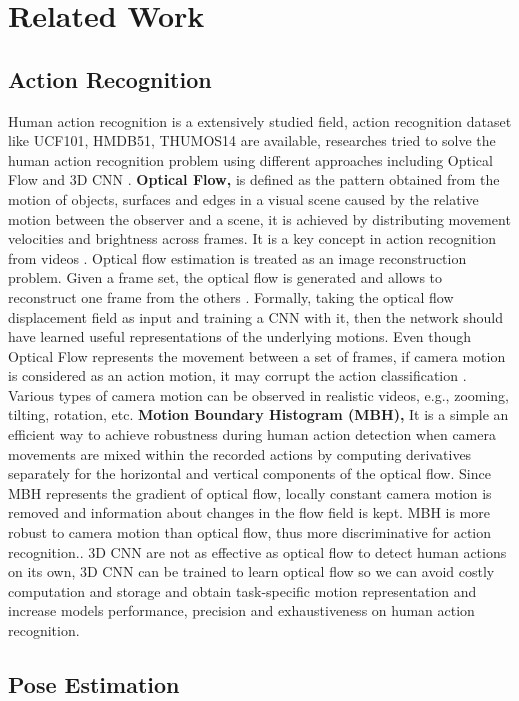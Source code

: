 \documentclass[twocolumn,conference]{article}
\begin{document}
\section{Related Work} \label{relatedwork}
\subsection{Action Recognition}
Human action recognition is a extensively studied field, action recognition dataset like UCF101, HMDB51, THUMOS14  are available, researches tried to solve the human action recognition problem using different approaches including Optical Flow and 3D CNN \cite{qiu2017learning}.  \textbf{Optical Flow,} is defined as the pattern obtained from the motion of objects, surfaces and edges in a visual scene caused by the relative motion between the observer and a scene, it is achieved by distributing movement velocities and brightness across frames. It is a  key concept in action recognition from videos \cite{wang2019hallucinating}. Optical flow estimation is treated as an image reconstruction problem. Given a frame set, the optical flow is generated and allows to reconstruct one frame from the others \cite{zhu2018hidden}. Formally, taking the optical flow displacement field as input and training a CNN with it, then the network should have learned useful representations of the underlying motions. Even though Optical Flow represents the movement between a set of frames, if camera motion is considered as an action motion, it may corrupt the action classification \cite{wang2013dense}. Various types of camera motion can be observed in realistic videos, e.g., zooming, tilting, rotation, etc. \textbf{Motion Boundary Histogram (MBH),} It is a simple an efficient way to achieve robustness during human action detection when camera movements are mixed within the recorded actions by computing derivatives separately for the horizontal and vertical components of the optical flow. Since MBH represents the gradient of optical flow, locally constant camera motion is removed and information about changes in the flow field is kept. MBH is more robust to camera motion than optical flow, thus more discriminative for action recognition.\cite{wang2013dense}. 3D CNN are not as effective as optical flow to detect human actions on its own, 3D CNN can be trained to learn optical flow so we can avoid costly computation and storage and obtain task-specific motion representation  \cite{zhu2018hidden} and increase models performance, precision and exhaustiveness on human action recognition.
\subsection{Pose Estimation}
\end{document}
